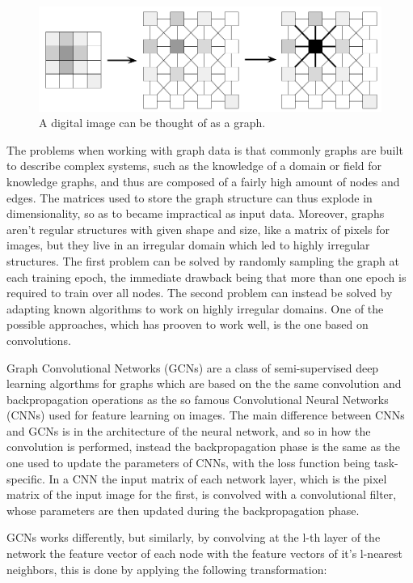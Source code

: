\documentclass[%
    corpo=13.5pt,
    twoside,
    oldstyle,
    tipotesi=magistrale,
    greek,
    evenboxes
]{toptesi}
\begin{document}
\begin{figure}[h]
    \centering
    \includegraphics[scale=0.4]{img/pixels-as-graph.png}
    \caption{A digital image can be thought of as a graph.}
    \label{fig:pixels-as-graph}
\end{figure}

The problems when working with graph data is that commonly graphs
are built to describe complex systems, such as the knowledge of a
domain or field for knowledge graphs, and thus are composed of
a fairly high amount of nodes and edges. The matrices used to
store the graph structure can thus explode in dimensionality, so as
to became impractical as input data. Moreover, graphs aren't
regular structures with given shape and size, like a matrix of pixels
for images, but they live in an irregular domain which led to highly
irregular structures.
The first problem can be solved by randomly sampling the graph at each
training epoch, the immediate drawback being that more than one epoch
is required to train over all nodes. The second problem can instead be
solved by adapting known algorithms to work on highly irregular domains.
One of the possible approaches, which has prooven to work well, is
the one based on convolutions.

Graph Convolutional Networks (GCNs) are a class of semi-supervised
deep learning algorthms for graphs which are based on the the same
convolution and backpropagation operations as the so famous
Convolutional Neural Networks (CNNs) used for feature learning on
images.
The main difference between CNNs and GCNs is in the architecture of
the neural network, and so in how the convolution is performed, instead
the backpropagation phase is the same as the one used to update the
parameters of CNNs, with the loss function being task-specific.
In a CNN the input matrix of each network layer, which is the pixel matrix
of the input image for the first, is convolved with a convolutional filter,
whose parameters are then updated during the backpropagation phase.

GCNs works differently, but similarly, by convolving at the l-th layer
of the network the feature vector of each node with the feature
vectors of it's l-nearest neighbors, this is done by applying the following
transformation:
\end{document}
